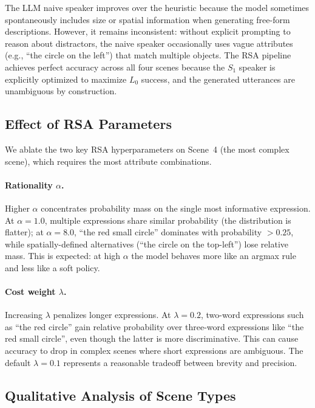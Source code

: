 \documentclass[10pt]{article}
\begin{document}
The LLM naive speaker improves over the heuristic because the model sometimes spontaneously includes size or spatial information when generating free-form descriptions. However, it remains inconsistent: without explicit prompting to reason about distractors, the naive speaker occasionally uses vague attributes (e.g., ``the circle on the left'') that match multiple objects. The RSA pipeline achieves perfect accuracy across all four scenes because the $S_1$ speaker is explicitly optimized to maximize $L_0$ success, and the generated utterances are unambiguous by construction.

\subsection{Effect of RSA Parameters}
\label{sec:ablation}

We ablate the two key RSA hyperparameters on Scene~4 (the most complex scene), which requires the most attribute combinations.

\paragraph{Rationality $\alpha$.} Higher $\alpha$ concentrates probability mass on the single most informative expression. At $\alpha = 1.0$, multiple expressions share similar probability (the distribution is flatter); at $\alpha = 8.0$, ``the red small circle'' dominates with probability $> 0.25$, while spatially-defined alternatives (``the circle on the top-left'') lose relative mass. This is expected: at high $\alpha$ the model behaves more like an argmax rule and less like a soft policy.

\paragraph{Cost weight $\lambda$.} Increasing $\lambda$ penalizes longer expressions. At $\lambda = 0.2$, two-word expressions such as ``the red circle'' gain relative probability over three-word expressions like ``the red small circle'', even though the latter is more discriminative. This can cause accuracy to drop in complex scenes where short expressions are ambiguous. The default $\lambda = 0.1$ represents a reasonable tradeoff between brevity and precision.

\subsection{Qualitative Analysis of Scene Types}
\end{document}

